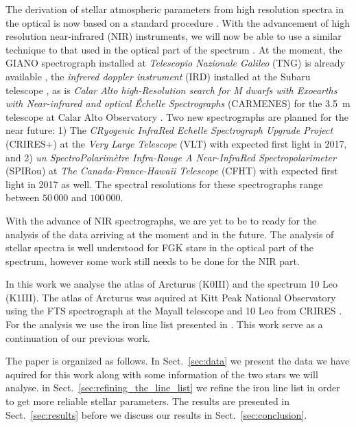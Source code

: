 \documentclass{aa}
\begin{document}
The derivation of stellar atmospheric parameters from high resolution spectra in
the optical is now based on a standard procedure
\citep[see e.g.][]{Valenti2005,Sousa2008a}. With the advancement of high
resolution near-infrared (NIR) instruments, we will now be able to use a similar
technique to that used in the optical part of the spectrum
\citep[see e.g.][]{Melendez1999,Sousa2008a,Tsantaki2013,Mucciarelli2013,Bensby2014}.
At the moment, the GIANO spectrograph installed at \emph{Telescopio Nazionale
Galileo} (TNG) is already available \citep{GIANO}, the \emph{infrered doppler
instrument} (IRD) installed at the Subaru telescope \citep{IRD}, as is
\emph{Calar Alto high-Resolution search for M dwarfs with Exoearths with
Near-infrared and optical Échelle Spectrographs} (CARMENES) for the \SI{3.5}{m}
telescope at Calar Alto Observatory \citep{CARMENES}. Two new spectrographs are
planned for the near future: 1) The \emph{CRyogenic InfraRed Echelle
Spectrograph Upgrade Project} (CRIRES+) at the \emph{Very Large Telescope} (VLT)
\citep{CRIRESp} with expected first light in 2017, and 2) \emph{un
SpectroPolarimètre Infra-Rouge A Near-InfraRed Spectropolarimeter} (SPIRou) at
\emph{The Canada-France-Hawaii Telescope} (CFHT) \citep{SPIROU1,SPIROU2} with
expected first light in 2017 as well. The spectral resolutions for these
spectrographs range between $50\,000$ and $100\,000$.

With the advance of NIR spectrographs, we are yet to be to ready for the
analysis of the data arriving at the moment and in the future. The analysis of
stellar spectra is well understood for FGK stars in the optical part of the
spectrum, however some work still needs to be done for the NIR part.

In this work we analyse the atlas of Arcturus (K0III) and the spectrum 10 Leo
(K1III). The atlas of Arcturus was aquired at Kitt Peak National Observatory
using the FTS spectrograph at the Mayall telescope \citep{Hinkle2003} and 10 Leo
from CRIRES \citep{Nicholls2016}. For the analysis we use the iron line list
presented in \citet{Andreasen2016}. This work serve as a continuation of our
previous work.

The paper is organized as follows. In Sect.~\ref{sec:data} we present the data
we have aquired for this work along with some information of the two stars we
will analyse. in Sect.~\ref{sec:refining_the_line_list} we refine the iron line
list in order to get more reliable stellar parameters. The results are presented
in Sect.~\ref{sec:results} before we discuss our results in
Sect.~\ref{sec:conclusion}.
\end{document}

